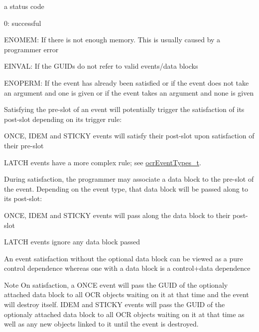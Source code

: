 \returns
a status code
\begin{DoxyItemize}
\item 0\-: successful
\item E\-N\-O\-M\-E\-M\-: If there is not enough memory. This is usually caused by a programmer error
\item E\-I\-N\-V\-A\-L\-: If the G\-U\-I\-Ds do not refer to valid events/data blocks
\item E\-N\-O\-P\-E\-R\-M\-: If the event has already been satisfied or if the event does not take an argument and one is given or if the event takes an argument and none is given
\end{DoxyItemize}


\descr
Satisfying the pre-\/slot of an event will potentially trigger the satisfaction of its post-\/slot depending on its trigger rule\-:
\begin{DoxyItemize}
\item O\-N\-C\-E, I\-D\-E\-M and S\-T\-I\-C\-K\-Y events will satisfy their post-\/slot upon satisfaction of their pre-\/slot
\item L\-A\-T\-C\-H events have a more complex rule;
see \hyperlink{group__OCRTypesEvents_ga42f4195355182edfaa79c9ef3f2c07b1}{ocr\-Event\-Types\-\_\-t}.
\end{DoxyItemize}

During satisfaction, the programmer may associate a data block to the pre-\/slot of the event. Depending
on the event type, that data block will be passed along to its post-\/slot\-:
\begin{DoxyItemize}
\item O\-N\-C\-E, I\-D\-E\-M and S\-T\-I\-C\-K\-Y events will pass along the data block to their post-\/slot
\item L\-A\-T\-C\-H events ignore any data block passed
\end{DoxyItemize}
An event satisfaction without the optional data block can be viewed as a pure control dependence
whereas one with a data block is a control+data dependence

\begin{DoxyNote}{Note}
On satisfaction, a O\-N\-C\-E event will pass the G\-U\-I\-D of the optionaly attached data
block to all O\-C\-R objects waiting on it at that time and the event will destroy itself. I\-D\-E\-M and S\-T\-I\-C\-K\-Y
events will pass the G\-U\-I\-D of the optionaly attached data block to all O\-C\-R objects waiting on it at that time as
well as any new objects linked to it until the event is destroyed.
\end{DoxyNote}

